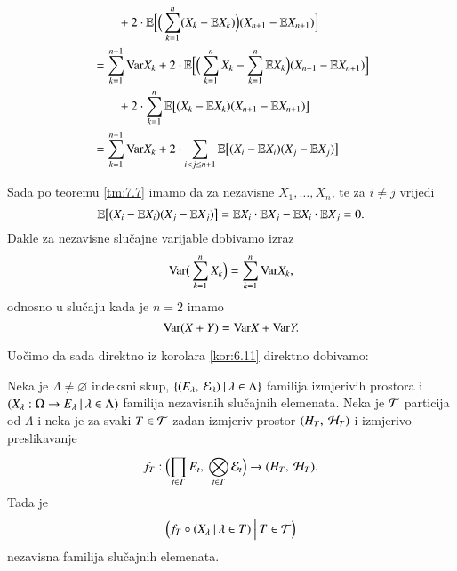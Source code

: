 \begin{rj}[\ref{zad:7.8}]
\begin{enumerate}
\begin{equation*}
\begin{aligned}
                &\quad \quad + 2 \cdot \mathbb{E} \Big[ \Big( \sum\limits_{k = 1}^{n} (X_k - \mathbb{E} X_k) \Big) (X_{n + 1} - \mathbb{E} X_{n + 1}) \Big]\\
                &= \sum\limits_{k = 1}^{n + 1} \mathrm{Var} X_k + 2 \cdot \mathbb{E} \Big[ \Big(  \sum\limits_{k = 1}^{n} X_k - \sum\limits_{k = 1}^{n} \mathbb{E} X_k \Big) (X_{n + 1} - \mathbb{E} X_{n + 1}) \Big]\\
                &\quad \quad + 2 \cdot \sum\limits_{k = 1}^{n} \mathbb{E} \big[ (X_k - \mathbb{E} X_k) (X_{n + 1} - \mathbb{E} X_{n + 1}) \big]\\
                &= \sum\limits_{k = 1}^{n + 1} \mathrm{Var} X_k + 2 \cdot \sum\limits_{i < j \leq n + 1}^{} \mathbb{E} \big[ (X_i - \mathbb{E} X_i) (X_j - \mathbb{E} X_j) \big]
            \end{aligned}
        \end{equation*}
    \end{enumerate}
    Sada po teoremu \ref{tm:7.7} imamo da za nezavisne $X_1, \ldots, X_n$, te za $i \neq j$ vrijedi
    \begin{equation*}
        \mathbb{E} \big[ (X_i - \mathbb{E} X_i) (X_j - \mathbb{E} X_j) \big] = \mathbb{E} X_i \cdot \mathbb{E} X_j - \mathbb{E} X_i \cdot \mathbb{E} X_j = 0.
    \end{equation*}
    Dakle za nezavisne slu\v cajne varijable dobivamo izraz
    \begin{equation*}
        \mathrm{Var} \big( \sum\limits_{k = 1}^{n} X_k \Big) = \sum\limits_{k = 1}^{n} \mathrm{Var} X_k,
    \end{equation*}
    odnosno u slu\v caju kada je $n = 2$ imamo
    \begin{equation*}
        \mathrm{Var} (X + Y) = \mathrm{Var} X + \mathrm{Var} Y.
    \end{equation*}
\end{rj}

Uo\v cimo da sada direktno iz korolara \ref{kor:6.11} direktno dobivamo:

\begin{kor} \label{kor:7.9}
    Neka je $\Lambda \neq  \varnothing$ indeksni skup, $\{{({E_\lambda}, \: {\mathcal{E}_\lambda})} \: | \: {\lambda \in \Lambda}\}$ familija izmjerivih prostora i $({X_\lambda : \Omega \to E_\lambda} \: | \: {\lambda \in \Lambda})$ familija nezavisnih slu\v cajnih elemenata.
    Neka je $\mathcal{T}$ particija od $\Lambda$ i neka je za svaki $T \in \mathcal{T}$ zadan izmjeriv prostor $({H_T}, \: {\mathcal{H}_T})$ i izmjerivo preslikavanje
    \begin{equation*}
        f_T : \Big( {\prod\limits_{t \in T}^{} E_t}, \: {\bigotimes\limits_{t \in T}^{} \mathcal{E}_t} \Big) \to ({H_T}, \: {\mathcal{H}_T}).
    \end{equation*}
    Tada je
    \begin{equation*}
        \Big( {f_T \circ ({X_\lambda} \: | \: {\lambda \in T})} \: \Big| \: {T \in \mathcal{T}} \Big)    
    \end{equation*}
    nezavisna familija slu\v cajnih elemenata.
\end{kor}

